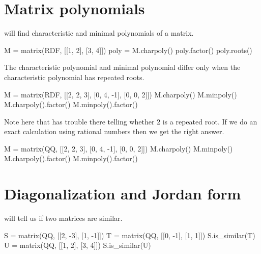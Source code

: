 



\section{Matrix polynomials}

\Sage{} will find characteristic and minimal polynomials of a matrix.
\begin{sageoutput}
M =  matrix(RDF, [[1, 2], [3, 4]]) 
poly = M.charpoly()
poly.factor()
poly.roots()
\end{sageoutput}

The characteristic polynomial and minimal polynomial differ only when 
the characteristic polynomial has repeated roots.
\begin{sageoutput}
M =  matrix(RDF, [[2, 2, 3], [0, 4, -1], [0, 0, 2]]) 
M.charpoly()
M.minpoly()
M.charpoly().factor()
M.minpoly().factor()
\end{sageoutput}
\noindent
Note here that \Sage{} has trouble there telling whether $2$ is a repeated 
root.
If we do an exact calculation using 
rational numbers then we get the right answer.  
\begin{sageoutput}
M =  matrix(QQ, [[2, 2, 3], [0, 4, -1], [0, 0, 2]]) 
M.charpoly()
M.minpoly()
M.charpoly().factor()
M.minpoly().factor()
\end{sageoutput}




\section{Diagonalization and Jordan form}

\Sage{} will tell us if two matrices are similar.
\begin{sageoutput}
S =  matrix(QQ, [[2, -3], [1, -1]]) 
T =  matrix(QQ, [[0, -1], [1,  1]]) 
S.is_similar(T)
U =  matrix(QQ, [[1, 2], [3,  4]]) 
S.is_similar(U)
\end{sageoutput}
\noindent

